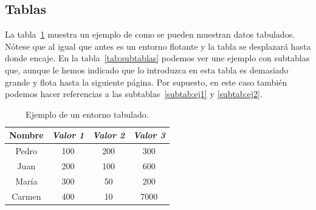 \documentclass{DeustoFDP}
\begin{document}
\subsection{Tablas}

La tabla~\ref{tab:ejemplo} muestra un ejemplo de como se pueden muestran
datos tabulados. N\'otese que al igual que antes es un entorno flotante
y la tabla se desplazar\'a hasta donde encaje. En la tabla~\ref{tab:subtablas}
podemos ver une ejemplo con subtablas que, aunque le hemos indicado que lo
introduzca en esta tabla es demasiado grande y flota hasta la siguiente p\'agina.
Por supuesto, en este caso tambi\'en podemos hacer referencias a las
subtablas~\ref{subtab:ej1} y \ref{subtab:ej2}.

\begin{table}
  \centering
  \caption{Ejemplo de un entorno tabulado.}\label{tab:ejemplo}
  \begin{tabular}{cccc}
    \toprule
      \textbf{Nombre} & \emph{Valor 1} & \emph{Valor 2} & \emph{Valor 3}\\
    \midrule
      Pedro  & 100     & 200     & 300 \\
      Juan   & 200     & 100     & 600 \\
      Mar\'ia& 300     & 50      & 200 \\
      Carmen & 400     & 10      & 7000\\
    \bottomrule
  \end{tabular}
\end{table}
\end{document}
